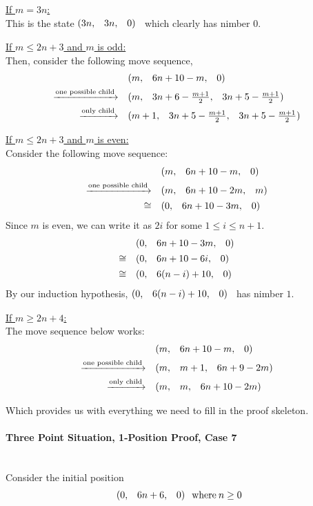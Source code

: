 \documentclass{article}
\makeatletter
\newcommand{\game}[3]{\begin{array}{@{}*6r}(#1, & #2, & #3)\end{array}}
\makeatother
\begin{document}
\bigskip
\underline{If $m = 3n$:} \\
This is the state $\game{3n}{3n}{0}$ which clearly has nimber $0$.

\bigskip
\underline{If $m \leq 2n + 3$ and $m$ is odd:} \\
Then, consider the following move sequence,
\begin{align*}
  & \game{m}{6n+10-m}{0} \\
  \xrightarrow{\text{one possible child}} \quad & 
  \game{m}{3n+6-\frac{m+1}{2}}{3n+5-\frac{m+1}{2}} \\
  \xrightarrow{\text{only child}} \quad & 
  \game{m+1}{3n+5-\frac{m+1}{2}}{3n+5-\frac{m+1}{2}} \\
\end{align*}

\bigskip
\underline{If $m \leq 2n + 3$ and $m$ is even:} \\
Consider the following move sequence:
\begin{align*}
  & \game{m}{6n+10-m}{0} \\
  \xrightarrow{\text{one possible child}} \quad & 
  \game{m}{6n+10-2m}{m} \\
  \cong \quad & 
  \game{0}{6n+10-3m}{0} \\
\end{align*}
Since $m$ is even, we can write it as $2i$ for some $1\leq i\leq n+1$.
\begin{align*}
  & \game{0}{6n+10-3m}{0} \\
  \cong \quad & \game{0}{6n+10-6i}{0} \\
  \cong \quad & \game{0}{6(n-i)+10}{0} \\
\end{align*}
By our induction hypothesis, $\game{0}{6(n-i)+10}{0}$ has nimber $1$.

\bigskip
\underline{If $m \geq 2n + 4$:} \\
The move sequence below works:
\begin{align*}
  & \game{m}{6n+10-m}{0} \\
  \xrightarrow{\text{one possible child}} \quad & 
  \game{m}{m+1}{6n+9-2m} \\
  \xrightarrow{\text{only child}} \quad & 
  \game{m}{m}{6n+10-2m} \\
\end{align*}

\bigskip
Which provides us with everything we need to fill in the proof
skeleton.
\newpage

\paragraph{Three Point Situation, 1-Position Proof, Case 7}\mbox{}\\
Consider the initial position
\begin{equation*}
  \game{0}{6n+6}{0} \: \text{where} \: n \geq 0
\end{equation*}
\end{document}

